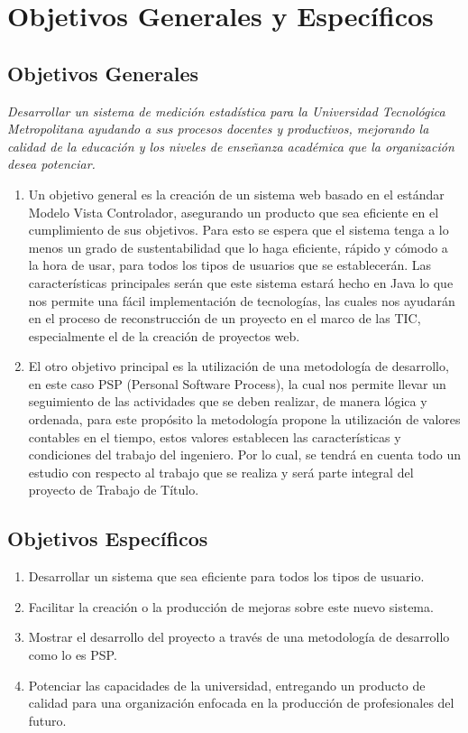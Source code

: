 \documentclass[a4paper,12pt,openany,oneside]{book}
\begin{document}
\section{Objetivos Generales y Específicos}
\subsection{Objetivos Generales}
\textit{Desarrollar un sistema de medición estadística para la Universidad Tecnológica Metropolitana ayudando a sus procesos docentes y productivos, mejorando la calidad de la educación y los niveles de enseñanza académica que la organización desea potenciar.}
\begin{enumerate}
\item Un objetivo general es la creación de un sistema web basado en el estándar Modelo Vista Controlador, asegurando un producto que sea eficiente en el cumplimiento de sus objetivos. Para esto se espera que el sistema tenga a lo menos un grado de sustentabilidad que lo haga eficiente, rápido y cómodo a la hora de usar, para todos los tipos de usuarios que se establecerán. Las características principales serán que este sistema estará hecho en Java lo que nos permite una fácil implementación de tecnologías, las cuales nos ayudarán en el proceso de reconstrucción de un proyecto en el marco de las TIC, especialmente el de la creación de proyectos web.
\item El otro objetivo principal es la utilización de una metodología de desarrollo, en este caso PSP (Personal Software Process), la cual nos permite llevar un seguimiento de las actividades que se deben realizar, de manera lógica y ordenada, para este propósito la metodología propone la utilización de valores contables en el tiempo, estos valores establecen las características y condiciones del trabajo del ingeniero. Por lo cual, se tendrá en cuenta todo un estudio con respecto al trabajo que se realiza y será parte integral del proyecto de Trabajo de Título.
\end{enumerate}
\subsection{Objetivos Específicos}
\begin{enumerate}
	\item Desarrollar un sistema que sea eficiente para todos los tipos de usuario.
	\item Facilitar la creación o la producción de mejoras sobre este nuevo sistema.
	\item Mostrar el desarrollo del proyecto a través de una metodología de desarrollo como lo es PSP.
	\item Potenciar las capacidades de la universidad, entregando un producto de calidad para una organización enfocada en la producción de profesionales del futuro.
\end{enumerate}
\end{document}
